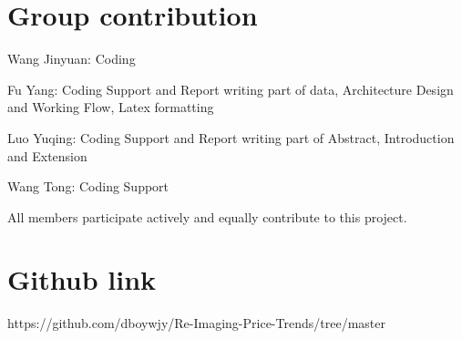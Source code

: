 \documentclass{article}
\begin{document}
\section*{Group contribution}
Wang Jinyuan: Coding

Fu Yang: Coding Support and Report writing part of data, Architecture Design and Working Flow, Latex formatting

Luo Yuqing: Coding Support and Report writing part of Abstract, Introduction and Extension

Wang Tong: Coding Support

All members participate actively and equally contribute to this project.

\section*{Github link}
https://github.com/dboywjy/Re-Imaging-Price-Trends/tree/master
\end{document}
